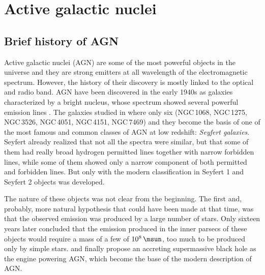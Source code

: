\documentclass[../main.tex]{subfiles}
\begin{document}
\chapter{Active galactic nuclei}
\label{cap:agn}

\section{Brief history of AGN}
\label{sec:intro_history}
Active galactic nuclei (AGN) are some of the most powerful objects in the universe and they are strong emitters at all wavelength of the electromagnetic spectrum.
However, the history of their discovery is mostly linked to the optical and radio band.
AGN have been discovered in the early 1940s as galaxies characterized by a bright nucleus, whose spectrum showed several powerful emission lines \citep{Seyfert43}.
The galaxies studied in \citet{Seyfert43} where only six (NGC\,1068, NGC\,1275, NGC\,3526, NGC\,4051, NGC\,4151, NGC\,7469) and they become the basis of one of the most famous and common classes of AGN at low redshift: \emph{Seyfert galaxies}. 
Seyfert already realized that not all the spectra were similar, but that some of them had really broad hydrogen permitted lines together with narrow forbidden lines, while some of them showed only a narrow component of both permitted and forbidden lines. 
But only with \citet{Khachikian74} the modern classification in Seyfert 1 and Seyfert 2 objects was developed.

The nature of these objects was not clear from the beginning.
The first and, probably, more natural hypothesis that could have been made at that time, was that the observed emission was produced by a large number of stars.
Only sixteen years later \citet{Woltjer59} concluded that the emission produced in the inner parsecs of these objects would require a mass of a few of $10^8\,\si{\msun}$, too much to be produced only by simple stars.
\citet{Salpeter64} and \citet{Zeldovich64} finally propose an accreting supermassive black hole as the engine powering AGN, which become the base of the modern description of AGN. 
\end{document}
